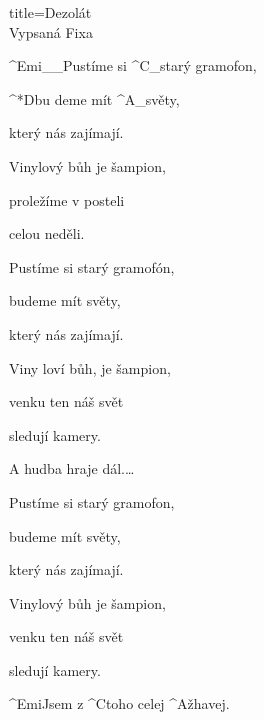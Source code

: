 \begin{song}{title=\predtitle\centering Dezolát\\\large Vypsaná Fixa \vspace*{-0.3cm}}
\begin{centerjustified}
\begin{varwidth}[t]{0.48\textwidth}
\sloka  %
	^{Emi{\color{white}\_\_}}Pustíme si ^{C{\color{white}\_}}starý gramofon,
	
	^*{D}bu deme mít ^{A{\color{white}\_}}světy, 
	
	který nás zajímají.
	
	Vinylový bůh je šampion,
	
	proležíme v posteli 
	
	celou neděli.
	
	Pustíme si starý gramofón,
	
	budeme mít světy,
	
	který nás zajímají.
	
	Viny loví bůh, je šampion,
	
	venku ten náš svět 
	
	sledují kamery.
	
	\phantom{h}
	
	A hudba hraje dál.\elipsa\dots
	
	\phantom{h}	
	
	Pustíme si starý gramofon,
	
	budeme mít světy, 
	
	který nás zajímají.
	
	Vinylový bůh je šampion,
	
	venku ten náš svět 
	
	sledují kamery.
	
	\phantom{j}
	
	^{Emi}Jsem z ^{C}toho celej ^{A}žhavej.
	
	
\end{varwidth}

\end{centerjustified}
\setcounter{Slokočet}{0}
\end{song}
